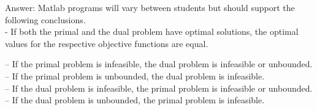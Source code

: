 \documentclass{article}
\begin{document}
\begin{enumerate}
Answer: Matlab programs will vary between students but should support the following conclusions.\\

- If both the primal and the dual problem have optimal solutions, the optimal values for the respective objective functions are equal.

– If the primal problem is infeasible, the dual problem is infeasible or unbounded. \\

– If the primal problem is unbounded, the dual problem is infeasible. \\

– If the dual problem is infeasible, the primal problem is infeasible or unbounded. \\

– If the dual problem is unbounded, the primal problem is infeasible. 


\end{enumerate}
\end{document}
